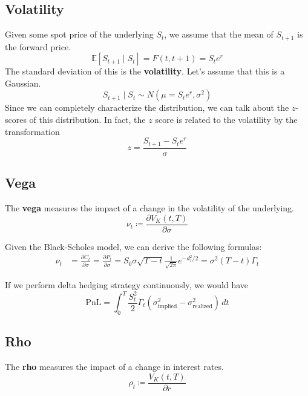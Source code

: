 \documentclass{article}
\begin{document}
  
  \subsection{Volatility}

    Given some spot price of the underlying $S_t$, we assume that the mean of $S_{t + 1}$ is the forward price. 
    \begin{equation}
      \mathbb{E}[S_{t+1} \mid S_t] = F(t, t+1) = S_t e^{r} 
    \end{equation} 
    The standard deviation of this is the \textbf{volatility}. Let's assume that this is a Gaussian. 
    \begin{equation}
      S_{t + 1} \mid S_t \sim N(\mu = S_t e^r, \sigma^2)
    \end{equation}
    Since we can completely characterize the distribution, we can talk about the $z$-scores of this distribution. In fact, the $z$ score is related to the volatility by the transformation 
    \begin{equation}
      z = \frac{S_{t + 1} - S_t e^r}{\sigma}
    \end{equation}

  \subsection{Vega}



    \begin{definition}[Vega]
      The \textbf{vega} measures the impact of a change in the volatility of the underlying. 
      \begin{equation}
        \nu_t \coloneqq \frac{\partial V_K (t, T)}{\partial \sigma}
      \end{equation}
    \end{definition}

    \begin{theorem}[Properties]
      Given the Black-Scholes model, we can derive the following formulas: 
      \begin{align*}
        \nu_t & = \frac{\partial C_t}{\partial \sigma} = \frac{\partial P_t}{\partial \sigma} = S_0 \sigma \sqrt{T - t} \frac{1}{\sqrt{2\pi}} e^{-d_1^2 / 2} = \sigma^2 (T - t) \Gamma_t 
      \end{align*}
    \end{theorem}

    If we perform delta hedging strategy continuously, we would have 
    \begin{equation}
      \text{PnL} = \int_0^T \frac{S_t^2}{2} \Gamma_t (\sigma_{\text{implied}}^2 - \sigma_{\text{realized}}^2 )\, dt
    \end{equation}


  \subsection{Rho}

    \begin{definition}[Rho]
      The \textbf{rho} measures the impact of a change in interest rates. 
      \begin{equation}
        \rho_t \coloneqq \frac{V_K (t, T)}{\partial r}
      \end{equation}
    \end{definition}
\end{document}
